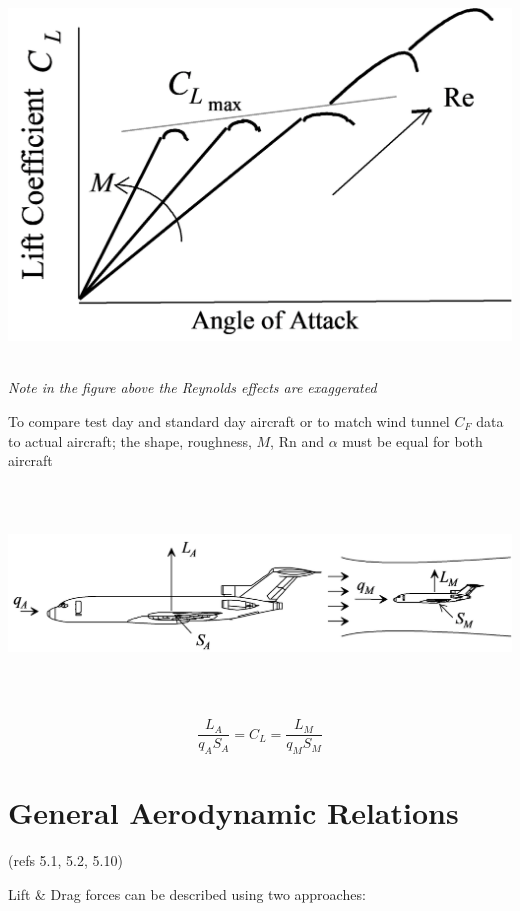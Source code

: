 \documentclass[
]{book}
\begin{document}
\includegraphics[width=5.854in,height=3.863in]{media/05/image7.svg}

\emph{Note in the figure above the Reynolds effects are exaggerated}

To compare test day and standard day aircraft or to match wind tunnel \(C_F\) data to actual aircraft; the shape, roughness, \(M\), \(\mathrm{Rn}\) and \(\alpha\) must be equal for both aircraft

\includegraphics[width=8.8in,height=2.25in]{media/05/image9.svg}

\[\frac{L_A}{q_A S_A} = C_L = \frac{L_M}{q_M S_M} \]

\hypertarget{general-aerodynamic-relations}{%
\section{General Aerodynamic Relations}\label{general-aerodynamic-relations}}

(refs 5.1, 5.2, 5.10)

Lift \& Drag forces can be described using two approaches:
\end{document}
